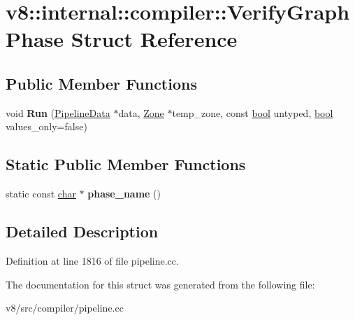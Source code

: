 \hypertarget{structv8_1_1internal_1_1compiler_1_1VerifyGraphPhase}{}\section{v8\+:\+:internal\+:\+:compiler\+:\+:Verify\+Graph\+Phase Struct Reference}
\label{structv8_1_1internal_1_1compiler_1_1VerifyGraphPhase}
\subsection*{Public Member Functions}
\begin{DoxyCompactItemize}
\item 
\mbox{\label{structv8_1_1internal_1_1compiler_1_1VerifyGraphPhase_a83d267e62b271fe30a1de9fcb0c09b2a}} 
void {\bfseries Run} (\mbox{\hyperlink{classv8_1_1internal_1_1compiler_1_1PipelineData}{Pipeline\+Data}} $\ast$data, \mbox{\hyperlink{classv8_1_1internal_1_1Zone}{Zone}} $\ast$temp\+\_\+zone, const \mbox{\hyperlink{classbool}{bool}} untyped, \mbox{\hyperlink{classbool}{bool}} values\+\_\+only=false)
\end{DoxyCompactItemize}
\subsection*{Static Public Member Functions}
\begin{DoxyCompactItemize}
\item 
\mbox{\label{structv8_1_1internal_1_1compiler_1_1VerifyGraphPhase_ac322644eb29ff666d44d2751c109e4c8}} 
static const \mbox{\hyperlink{classchar}{char}} $\ast$ {\bfseries phase\+\_\+name} ()
\end{DoxyCompactItemize}


\subsection{Detailed Description}


Definition at line 1816 of file pipeline.\+cc.



The documentation for this struct was generated from the following file\+:\begin{DoxyCompactItemize}
\item 
v8/src/compiler/pipeline.\+cc\end{DoxyCompactItemize}
